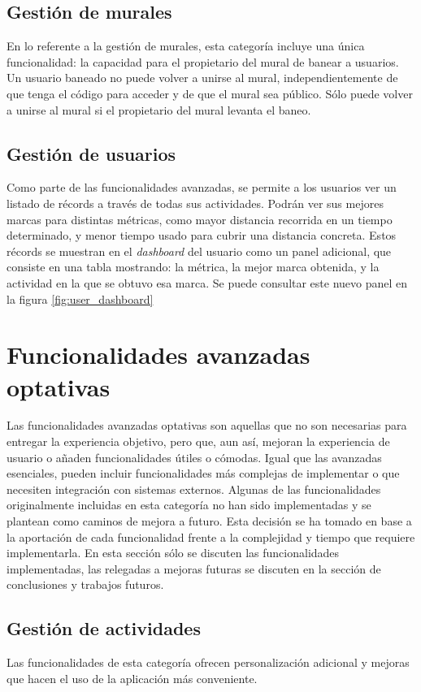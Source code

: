 \subsection{Gestión de murales}
En lo referente a la gestión de murales, esta categoría incluye una única funcionalidad: la capacidad para el propietario del mural de banear a usuarios. Un usuario baneado no puede volver a unirse al mural, independientemente de que tenga el código para acceder y de que el mural sea público. Sólo puede volver a unirse al mural si el propietario del mural levanta el baneo.

\subsection{Gestión de usuarios}
Como parte de las funcionalidades avanzadas, se permite a los usuarios ver un listado de récords a través de todas sus actividades. Podrán ver sus mejores marcas para distintas métricas, como mayor distancia recorrida en un tiempo determinado, y menor tiempo usado para cubrir una distancia concreta. Estos récords se muestran en el \textit{dashboard} del usuario como un panel adicional, que consiste en una tabla mostrando: la métrica, la mejor marca obtenida, y la actividad en la que se obtuvo esa marca. Se puede consultar este nuevo panel en la figura \ref{fig:user_dashboard}

\section{Funcionalidades avanzadas optativas}

Las funcionalidades avanzadas optativas son aquellas que no son necesarias para entregar la experiencia objetivo, pero que, aun así, mejoran la experiencia de usuario o añaden funcionalidades útiles o cómodas. Igual que las avanzadas esenciales, pueden incluir funcionalidades más complejas de implementar o que necesiten integración con sistemas externos. Algunas de las funcionalidades originalmente incluidas en esta categoría no han sido implementadas y se plantean como caminos de mejora a futuro. Esta decisión se ha tomado en base a la aportación de cada funcionalidad frente a la complejidad y tiempo que requiere implementarla. En esta sección sólo se discuten las funcionalidades implementadas, las relegadas a mejoras futuras se discuten en la sección de conclusiones y trabajos futuros.

\subsection{Gestión de actividades}
Las funcionalidades de esta categoría ofrecen personalización adicional y mejoras que hacen el uso de la aplicación más conveniente.

